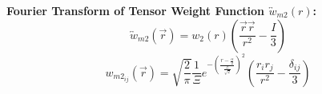 \documentclass[letterpaper,twocolumn,amsmath,amssymb,prb]{revtex4-1}
\begin{document}
\begin{widetext}
\noindent\textbf{Fourier Transform of Tensor Weight Function $\overleftrightarrow{w}_{m2}(r)$:}
\begin{equation}{\overleftrightarrow{w}_{m2}(\vec{r})=w_2(r)\left(\frac{\vec{r}\vec{r}}{r^2}-\frac{I}{3}\right)}\end{equation}
\begin{equation}{w_{m2_{ij}}(\vec{r})=\sqrt{\frac{2}{\pi}}\frac{1}{\Xi}e^{-\left(\frac{r-\frac{\alpha}{2}}{\frac{\Xi}{\sqrt{2}}}\right)^2}\left(\frac{r_ir_j}{r^2}-\frac{\delta_{ij}}{3}\right)}\end{equation}

\end{widetext}
\end{document}
